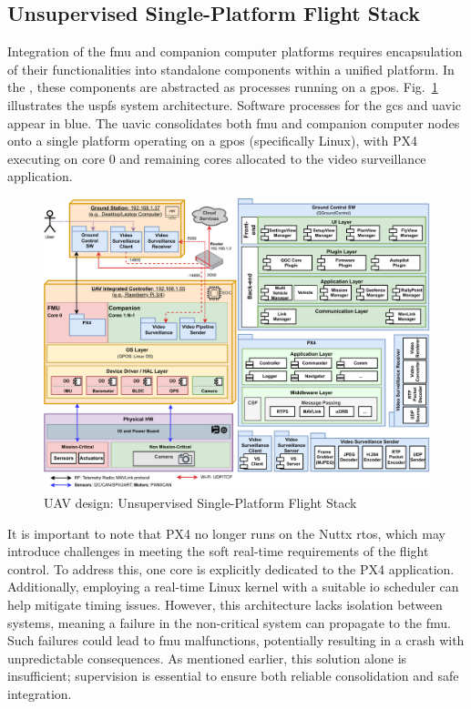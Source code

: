 \subsection{Unsupervised Single-Platform Flight Stack}
\label{sec:unsuperv-stack}
Integration of the \gls{fmu} and companion computer platforms requires
encapsulation of their functionalities into standalone components within a
unified platform. In the , these components are abstracted as
processes running on a \gls{gpos}.
%
Fig.~\ref{fig:uav-design-unsup} illustrates the \gls{uspfs} system
architecture. Software processes for the \gls{gcs} and \gls{uavic} appear in
blue. The \gls{uavic} consolidates both \gls{fmu} and companion computer nodes
onto a single platform operating on a \gls{gpos} (specifically Linux), with PX4
executing on core 0 and remaining cores allocated to the video surveillance
application.

\begin{figure}[!hbt]
  \centering
  \includegraphics[width=1.0\textwidth]{./img/pdf/uav-main-design-unsup.pdf} 
%   
  \caption{UAV design: Unsupervised Single-Platform Flight Stack}%
  \label{fig:uav-design-unsup}
\end{figure}

It is important to note that PX4 no longer runs on the Nuttx \gls{rtos}, which
may introduce challenges in meeting the soft real-time requirements of the flight
control. To address this, one core is explicitly dedicated to the PX4
application. Additionally, employing a real-time Linux kernel with a suitable
\gls{io} scheduler can help mitigate timing issues.
%
However, this architecture lacks isolation between systems, meaning a failure in
the non-critical system can propagate to the \gls{fmu}. Such failures could lead
to \gls{fmu} malfunctions, potentially resulting in a crash with unpredictable
consequences. As mentioned earlier, this solution alone is insufficient;
supervision is essential to ensure both reliable consolidation and safe
integration.


